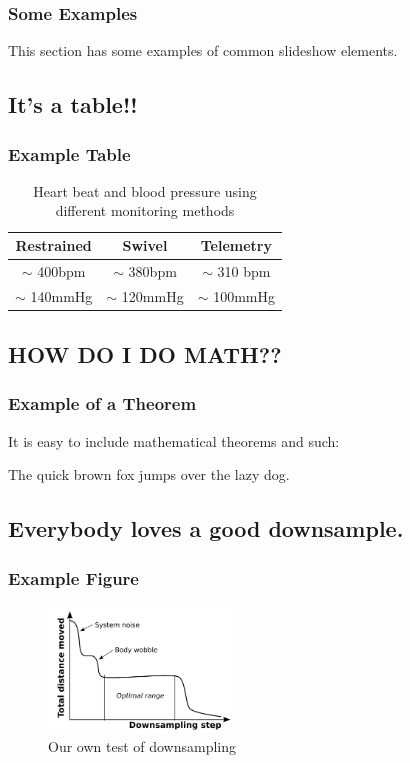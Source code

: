 \documentclass{beamer}
\begin{document}
\frame
{
	\frametitle{Some Examples}

	This section has some examples of common slideshow elements.
}

\subsection{It's a table!!}

\frame
{
	\frametitle{Example Table}
	
	\begin{table}
	\centering
	\begin{tabular}{|c|c|c|} \hline \hline
	Restrained     & Swivel         & Telemetry      \\ \hline \hline
	$\sim$ 400bpm  & $\sim$ 380bpm  & $\sim$ 310 bpm \\
	$\sim$ 140mmHg & $\sim$ 120mmHg & $\sim$ 100mmHg \\ \hline \hline
	\end{tabular}
	\caption{Heart beat and blood pressure using different monitoring methods}
	\label{tbl:kramer}
	\end{table}
}

\subsection{HOW DO I DO MATH??}
\frame
{
	\frametitle{Example of a Theorem}
	It is easy to include mathematical theorems and such:
	\begin{theorem}
	The quick brown fox jumps over the lazy dog.
	\end{theorem}
}


\subsection{Everybody loves a good downsample.}
\frame
{
	\frametitle{Example Figure}
	
	\begin{figure}
	\centering
	\includegraphics[width=5cm]{sample_rate.png}
	\caption{Our own test of downsampling}
	\label{fig:test_down_sampling}
	\end{figure}
}
\end{document}

